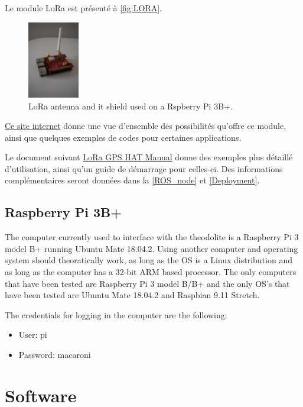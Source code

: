 \documentclass[10pt,letterpaper,oneside]{article}
\begin{document}
Le module LoRa est présenté à \autoref{fig:LORA}.

\begin{figure}[htb]
	\centering
	\includegraphics[width=0.2\textwidth]{./figs/LoRa_antenna.JPG}
	\caption{LoRa antenna and it shield used on a Rspberry Pi 3B+.}
	\label{fig:LORA}
\end{figure}

\href{https://wiki.dragino.com/index.php?title=Lora/GPS_HAT}{Ce site internet} donne une vue d'ensemble des possibilités qu'offre ce module, ainsi que quelques exemples de codes pour certaines applications.

Le document suivant \href{run:LoRa_GPS_HAT_manual.pdf}{LoRa GPS HAT Manual} donne des exemples plus détaillé d'utilisation, ainsi qu'un guide de démarrage pour celles-ci.
Des informations complémentaires seront données dans la \autoref{ROS_node} et \autoref{Deployment}.

\subsection{Raspberry Pi 3B+}

The computer currently used to interface with the theodolite is a Raspberry Pi 3 model B+ running Ubuntu Mate 18.04.2. 
Using another computer and operating system should theoratically work, as long as the OS is a Linux distribution and as long as the computer has a 32-bit ARM based processor. 
The only computers that have been tested are Raspberry Pi 3 model B/B+ and the only OS's that have been tested are Ubuntu Mate 18.04.2 and Raspbian 9.11 Stretch.

The credentials for logging in the computer are the following:

\begin{itemize}
    \item User: pi
    \item Password: macaroni
\end{itemize}


\section{Software}
\label{sec:software}
\end{document}
